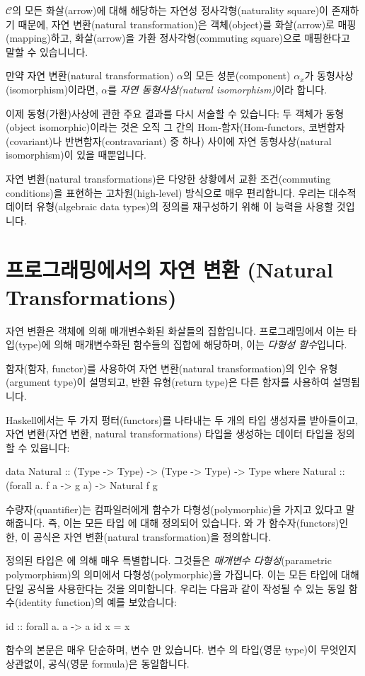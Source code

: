 \documentclass[DaoFP]{subfiles}
\begin{document}
$\mathcal{C}$의 모든 화살(arrow)에 대해 해당하는 자연성 정사각형(naturality square)이 존재하기 때문에, 자연 변환(natural transformation)은 객체(object)를 화살(arrow)로 매핑(mapping)하고, 화살(arrow)을 가환 정사각형(commuting square)으로 매핑한다고 말할 수 있습니니다.

만약 자연 변환(natural transformation) $\alpha$의 모든 성분(component) $\alpha_x$가 동형사상(isomorphism)이라면, $\alpha$를 \emph{자연 동형사상(natural isomorphism)}이라 합니다.

이제 동형(가환)사상에 관한 주요 결과를 다시 서술할 수 있습니다: 두 객체가 동형(object isomorphic)이라는 것은 오직 그 간의 Hom-함자(Hom-functors, 코변함자(covariant)나 반변함자(contravariant) 중 하나) 사이에 자연 동형사상(natural isomorphism)이 있을 때뿐입니다.

자연 변환(natural transformations)은 다양한 상황에서 교환 조건(commuting conditions)을 표현하는 고차원(high-level) 방식으로 매우 편리합니다. 우리는 대수적 데이터 유형(algebraic data types)의 정의를 재구성하기 위해 이 능력을 사용할 것입니다.

\section{프로그래밍에서의 자연 변환 (Natural Transformations)}

자연 변환은 객체에 의해 매개변수화된 화살들의 집합입니다. 프로그래밍에서 이는 타입(type)에 의해 매개변수화된 함수들의 집합에 해당하며, 이는 \emph{다형성 함수}입니다.

함자(함자, functor)를 사용하여 자연 변환(natural transformation)의 인수 유형(argument type)이 설명되고, 반환 유형(return type)은 다른 함자를 사용하여 설명됩니다.

Haskell에서는 두 가지 펑터(functors)를 나타내는 두 개의 타입 생성자를 받아들이고, 자연 변환(자연 변환, natural transformations) 타입을 생성하는 데이터 타입을 정의할 수 있읍니다:

\begin{haskell}
data Natural :: (Type -> Type) -> (Type -> Type) -> Type where
  Natural :: (forall a. f a -> g a) -> Natural f g
\end{haskell}
 수량자(quantifier)는 컴파일러에게 함수가 다형성(polymorphic)을 가지고 있다고 말해줍니다. 즉, 이는 모든 타입 에 대해 정의되어 있습니다. 와 가 함수자(functors)인 한, 이 공식은 자연 변환(natural transformation)을 정의합니다.

정의된 타입은 에 의해 매우 특별합니다. 그것들은 \emph{매개변수 다형성}(parametric polymorphism)의 의미에서 다형성(polymorphic)을 가집니다. 이는 모든 타입에 대해 단일 공식을 사용한다는 것을 의미합니다. 우리는 다음과 같이 작성될 수 있는 동일 함수(identity function)의 예를 보았습니다:
\begin{haskell}
id :: forall a. a -> a
id x = x
\end{haskell}
함수의 본문은 매우 단순하며, 변수 만 있습니다. 변수 의 타입(영문 type)이 무엇인지 상관없이, 공식(영문 formula)은 동일합니다.
\end{document}
